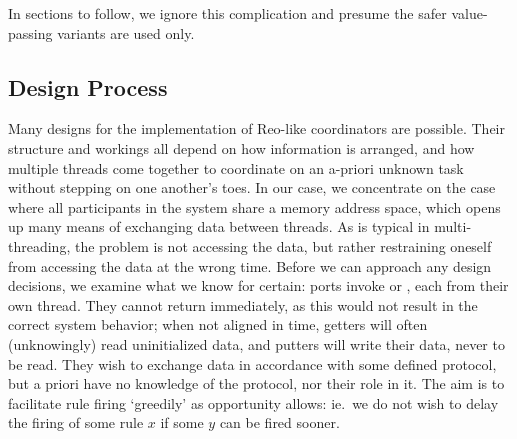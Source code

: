 In sections to follow, we ignore this complication and presume the safer value-passing variants are used only.

\subsection{Design Process}
\label{sec:chosen_design}
Many designs for the implementation of Reo-like coordinators are possible. Their structure and workings all depend on how information is arranged, and how multiple threads come together to coordinate on an a-priori unknown task without stepping on one another's toes. In our case, we concentrate on the case where all participants in the system share a memory address space, which opens up many means of exchanging data between threads. As is typical in multi-threading, the problem is not accessing the data, but rather restraining oneself from accessing the data at the wrong time. Before we can approach any design decisions, we examine what we know for certain: ports invoke  or , each from their own thread. They cannot return immediately, as this would not result in the correct system behavior; when not aligned in time, getters will often (unknowingly) read uninitialized data, and putters will write their data, never to be read. They wish to exchange data in accordance with some defined protocol, but a priori have no knowledge of the protocol, nor their role in it. The aim is to facilitate rule firing `greedily' as opportunity allows: ie.\ we do not wish to delay the firing of some rule $x$ if some $y$ can be fired sooner.

